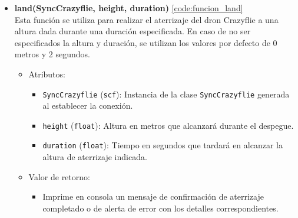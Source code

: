 \begin{itemize}
	\item \textbf{land(SyncCrazyflie, height, duration)} \ref{code:funcion_land}\\ 
	Esta función se utiliza para realizar el aterrizaje del dron Crazyflie a una altura dada durante una duración especificada. En caso de no ser especificados la altura y duración, se utilizan los valores por defecto de 0 metros y 2 segundos.
	\begin{itemize}
		\item Atributos:
		\begin{itemize}
			\item \texttt{SyncCrazyflie} (\texttt{scf}): Instancia de la clase \texttt{SyncCrazyflie} generada al establecer la conexión.
			\item \texttt{height} (\texttt{float}): Altura en metros que alcanzará durante el despegue. 
			\item \texttt{duration} (\texttt{float}): Tiempo en segundos que tardará en alcanzar la altura de aterrizaje indicada.
		\end{itemize}
		\item Valor de retorno:
		\begin{itemize}
			\item Imprime en consola un mensaje de confirmación de aterrizaje completado o de alerta de error con los detalles correspondientes.
		\end{itemize}
	\end{itemize} 
	\vspace{5mm} %
	

\end{itemize}
